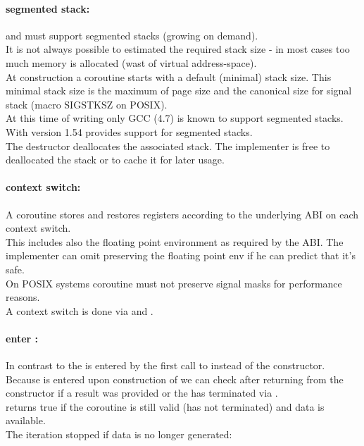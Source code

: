 \paragraph*{segmented stack:}
\pushcoro and \pullcoro must support segmented stacks (growing on demand).\\
\newline
It is not always possible to estimated the required stack size - in most cases
too much memory is allocated (wast of virtual address-space).\\
\newline
At construction a coroutine starts with a default (minimal) stack size. This minimal
stack size is the maximum of page size and the canonical size for signal stack
(macro SIGSTKSZ on POSIX).\\
\newline
At this time of writing only GCC (4.7)\cite{gccsplit} is known to support segmented
stacks. With version 1.54 \boostcoroutine provides support for segmented stacks.\\
\newline
The destructor deallocates the associated stack. The implementer is free to
deallocated the stack or to cache it for later usage.

\paragraph*{context switch:}
A coroutine stores and restores registers according to the underlying ABI on each
context switch.\\
\newline
This includes also the floating point environment as required by the ABI. The
implementer can omit preserving the floating point env if he can predict that
it's safe.\\
\newline
On POSIX systems coroutine must not preserve signal masks for performance reasons.\\
\newline
A context switch is done via \pushcoroop and \pullcoroop.

\paragraph*{enter \corofunction:}
In contrast to \pullcoro the \corofunction is entered by the first call to
\pushcoroop instead of the constructor.\\
\newline
Because \corofunction is entered upon construction of \pullcoro we can check after
returning from the constructor if a result was provided or the \corofunction
has terminated via \pullcorobool.\\
\pullcorobool returns true if the coroutine is still valid (\corofunction has
not terminated) and data is available.\\
The iteration stopped if data is no longer generated:

